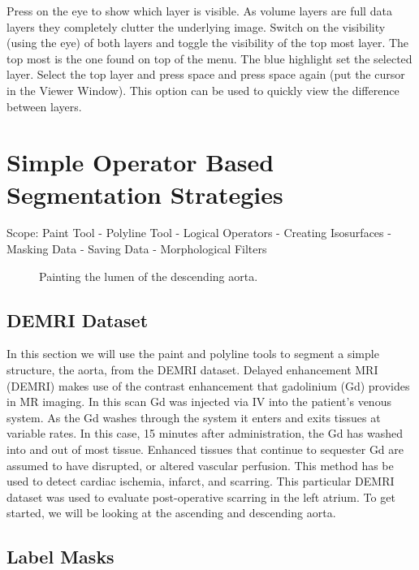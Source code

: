 \documentclass[fleqn,11pt,openany]{book}
\begin{document}
Press on the eye to show which layer is visible. As volume layers are full data layers they completely clutter the underlying image.
Switch on the visibility (using the eye) of both layers and toggle the visibility of the top most layer.  The top most is the one found on top of the menu. 
The blue highlight set the selected layer.  Select the top layer and press space and press space again (put the cursor in the Viewer Window).
This option can be used to quickly view the difference between layers.



\chapter{Simple Operator Based Segmentation Strategies}

\begin{introduction}
Scope: Paint Tool - Polyline Tool - Logical Operators - Creating Isosurfaces - Masking Data - Saving Data - Morphological Filters
\end{introduction}

\begin{figure}
\caption{Painting the lumen of the descending aorta.}\label{fig:paintlumen}
\end{figure}

\section{DEMRI Dataset}

In this section we will use the paint and polyline tools to segment a simple structure, the aorta, from the DEMRI dataset.  Delayed enhancement MRI (DEMRI) makes use of the contrast enhancement that gadolinium (Gd) provides in MR imaging.  In this scan Gd was injected via IV into the patient's venous system.  As the Gd washes through the system it enters and exits tissues at variable rates.  In this case, 15 minutes after administration, the Gd has washed into and out of most tissue.  Enhanced tissues that continue to sequester Gd are assumed to have disrupted, or altered vascular perfusion.  This method has be used to detect cardiac ischemia, infarct, and scarring.  This particular DEMRI dataset was used to evaluate post-operative scarring in the left atrium.  To get started, we will be looking at the ascending and descending aorta.

\section{Label Masks}
\end{document}
